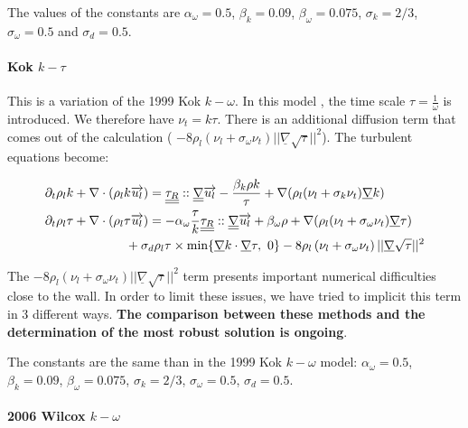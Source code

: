 The values of the constants are	$\alpha_{\omega} = 0.5$, $\beta_{k} = 0.09$, $\beta_{\omega} = 0.075$, $\sigma_k = 2/3$, $\sigma_{\omega} = 0.5$ and $\sigma_d = 0.5$.

\paragraph{Kok $k-\tau$}\mbox{}

This is a variation of the 1999 Kok $k-\omega$. In this model \cite{Ktau2000}, the time scale $\tau = \frac{1}{\omega}$ is introduced. We therefore have $\nu_t = k\tau$. There is an additional diffusion term that comes out of the calculation ( $- 8  \rho_l(\nu_l + \sigma_{\omega} \nu_t) ||\underline{\nabla}\sqrt{\tau}||^2$). The turbulent equations become:

\begin{align} \label{eq_tau}
		&\partial_t \rho_l k + \nabla \cdot ( \rho_l k \vec{u_l}) 
		=  \underline{\underline{\tau_R}}::\underline{\underline{\nabla}}\vec{u_l} 
		- \frac{\beta_{k}\rho k}{\tau} 
		+ \nabla( \rho_l(\nu_l + \sigma_k \nu_t) \underline{\nabla} k) \\
		&\begin{multlined}
		\partial_t  \rho_l \tau + \nabla \cdot ( \rho_l \tau \vec{u_l})
		=  - \alpha_{\omega}  \frac{\tau}{k}\underline{\underline{\tau_R}}::\underline{\underline{\nabla}}\vec{u_l} 
	  	 + \beta_{\omega}\rho 
		 +\nabla( \rho_l(\nu_l + \sigma_{\omega} \nu_t) \underline{\nabla} \tau)\\
 		 + \sigma_d \rho_l \tau \times{} \text{min}\acco{\underline{\nabla}k \cdot \underline{\nabla} \tau,\ 0}
 		 - 8  \rho_l\parent{\nu_l + \sigma_{\omega} \nu_t} ||\underline{\nabla}\sqrt{\tau}||^2
		\end{multlined}
\end{align}

The $- 8  \rho_l(\nu_l + \sigma_{\omega} \nu_t) ||\underline{\nabla}\sqrt{\tau}||^2$ term presents important numerical difficulties close to the wall. In order to limit these issues, we have tried to implicit this term in 3 different ways. \textbf{The comparison between these methods and the determination of the most robust solution is ongoing}.

The constants are the same than in the 1999 Kok $k-\omega$ model: $\alpha_{\omega} = 0.5$, $\beta_{k} = 0.09$, $\beta_{\omega} = 0.075$, $\sigma_k = 2/3$, $\sigma_{\omega} = 0.5$, $\sigma_d = 0.5$.

\paragraph{2006 Wilcox $k-\omega$}\mbox{}

